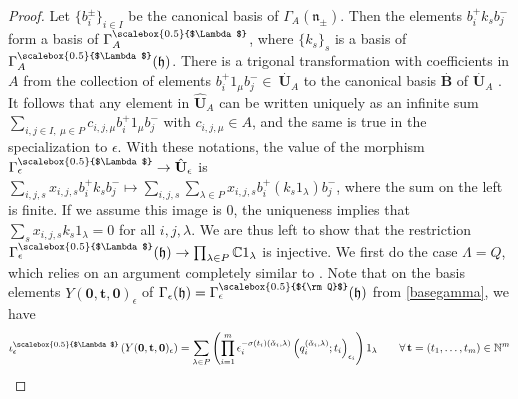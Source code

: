 \documentclass[11pt]{amsart}
\newcommand{\e}{\epsilon}
\newcommand{\Q}{{\scalebox{0.5}{${\rm Q}$}}}
\newcommand{\Lam}{{\scalebox{0.5}{$\Lambda$}}}
\begin{document}
\begin{proof}
Let $\{ b^{\pm}_i\}_{i \in I}$ be the canonical basis of $\Gamma_A(\mathfrak{n}_{\pm})$. Then the elements $b^+_i k_s b^-_j$ form a basis of $\Gamma_A^\Lam$, where $\{k_s\}_s$ is a basis of $\Gamma_A^\Lam(\mathfrak{h})$. There is a trigonal transformation with coefficients in $A$ from the collection of elements $b^+_i 1_\mu b^-_j \in \:\stackrel{.}{\mathbf{U}}_A$ to the canonical basis $\stackrel{.}{\mathbf{B}}$ of $\stackrel{.}{\mathbf{U}}_A$ \cite[\S 25.2]{Lusztig}. It follows that any element in $\hat{\mathbf{U}}_A$ can be written uniquely as an infinite sum $\textstyle \sum_{i,j\in I, \: \mu \in P} c_{i,j,\mu} b^+_i 1_\mu b^-_j$ with $c_{i,j,\mu} \in A$, and the same is true in the specialization to $\epsilon$. With these notations, the value of the morphism $\Gamma_\e^\Lam \to \hat{{\mathbf{U}}}_\e$ is
$\textstyle \sum_{i,j, s} x_{i,j,s} b^+_i k_s b^-_j \mapsto \sum_{i,j, s} \sum_{\lambda\in P} x_{i,j,s} b^+_i (k_s1_\lambda) b^-_j$, where the sum on the left is finite. If we assume this image is $0$, the uniqueness implies that $\textstyle \sum_s x_{i,j,s} k_s1_{\lambda} = 0$ for all $i,j,\lambda$. We are thus left to show that the restriction $\textstyle \Gamma_{\epsilon}^\Lam(\mathfrak{h}) \to \prod_{\lambda \in P} \mathbb{C}1_{\lambda}$ is injective. We first do the case $\Lambda = Q$, which relies on an argument completely similar to \cite[Th.\,3.1]{DC-L}. Note that on the basis elements $Y(\mathbf{0},\mathbf{t},\mathbf{0})_\e$ of $\Gamma_{\epsilon}(\mathfrak{h}) = \Gamma^\Q_{\epsilon}(\mathfrak{h})$ from \eqref{basegamma}, we have
\begin{equation}\label{mapYnov25}
\iota_\e^\Lam\left(Y(\mathbf{0},\mathbf{t},\mathbf{0})_{\epsilon}\right) = \sum_{\lambda \in P} \left( \prod_{i=1}^m \epsilon^{-\sigma(t_i)(\check{\alpha}_i,\lambda)}_i\left(q_i^{(\check{\alpha}_i,\lambda)}; t_i\right)_{\epsilon_i} \right) 1_\lambda \qquad \forall \, \mathbf{t} = (t_1,\ldots,t_m) \in \mathbb{N}^m
\end{equation}

\end{proof}
\end{document}
